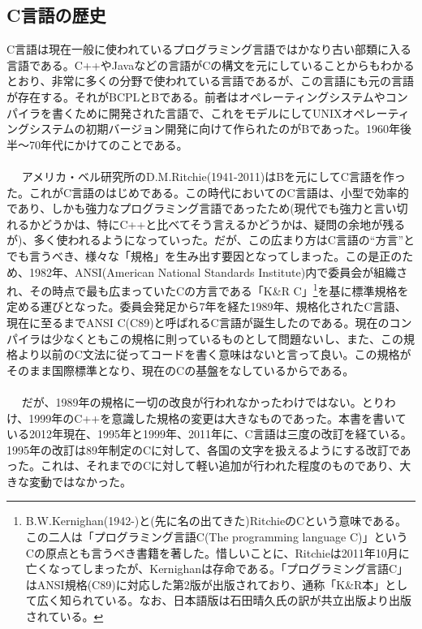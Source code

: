 \subsection{C言語の歴史}
C言語は現在一般に使われているプログラミング言語ではかなり古い部類に入る言語である。C++やJavaなどの言語がCの構文を元にしていることからもわかるとおり、非常に多くの分野で使われている言語であるが、この言語にも元の言語が存在する。それがBCPLとBである。前者はオペレーティングシステムやコンパイラを書くために開発された言語で、これをモデルにしてUNIXオペレーティングシステムの初期バージョン開発に向けて作られたのがBであった。1960年後半〜70年代にかけてのことである。
\\ \\　
アメリカ・ベル研究所のD.M.Ritchie(1941-2011)はBを元にしてC言語を作った。これがC言語のはじめである。この時代においてのC言語は、小型で効率的であり、しかも強力なプログラミング言語であったため(現代でも強力と言い切れるかどうかは、特にC++と比べてそう言えるかどうかは、疑問の余地が残るが)、多く使われるようになっていった。だが、この広まり方はC言語の“方言”とでも言うべき、様々な「規格」を生み出す要因となってしまった。この是正のため、1982年、ANSI(American National Standards Institute)内で委員会が組織され、その時点で最も広まっていたCの方言である「K\&R C」\footnote{B.W.Kernighan(1942-)と(先に名の出てきた)RitchieのCという意味である。この二人は「プログラミング言語C(The programming language C)」というCの原点とも言うべき書籍を著した。惜しいことに、Ritchieは2011年10月に亡くなってしまったが、Kernighanは存命である。「プログラミング言語C」はANSI規格(C89)に対応した第2版が出版されており、通称「K\&R本」として広く知られている。なお、日本語版は石田晴久氏の訳が共立出版より出版されている。}を基に標準規格を定める運びとなった。委員会発足から7年を経た1989年、規格化されたC言語、現在に至るまでANSI C(C89)と呼ばれるC言語が誕生したのである。現在のコンパイラは少なくともこの規格に則っているものとして問題ないし、また、この規格より以前のC文法に従ってコードを書く意味はないと言って良い。この規格がそのまま国際標準となり、現在のCの基盤をなしているからである。
\\ \\　
だが、1989年の規格に一切の改良が行われなかったわけではない。とりわけ、1999年のC++を意識した規格の変更は大きなものであった。本書を書いている2012年現在、1995年と1999年、2011年に、C言語は三度の改訂を経ている。1995年の改訂は89年制定のCに対して、各国の文字を扱えるようにする改訂であった。これは、それまでのCに対して軽い追加が行われた程度のものであり、大きな変動ではなかった。

